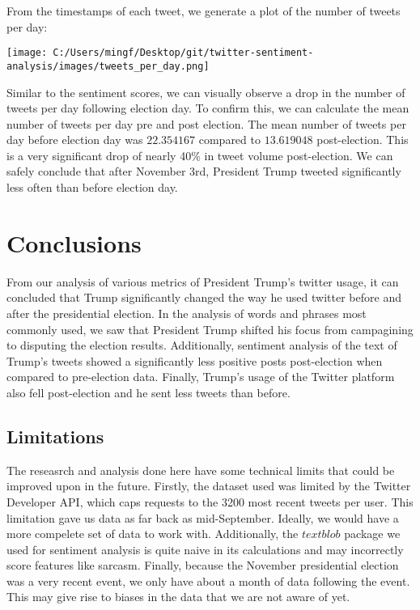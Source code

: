 \documentclass[11pt]{article} %
\begin{document}
From the timestamps of each tweet, we generate a plot of the number of tweets per day:

\begin{center}
    \texttt{[image: C:/Users/mingf/Desktop/git/twitter-sentiment-analysis/images/tweets\_per\_day.png]}
\end{center}

Similar to the sentiment scores, we can visually observe a drop in the number of tweets per day following election day.
To confirm this, we can calculate the mean number of tweets per day pre and post election.
The mean number of tweets per day before election day was $22.354167$ compared to $13.619048$ post-election.
This is a very significant drop of nearly 40\% in tweet volume post-election.
We can safely conclude that after November 3rd, President Trump tweeted significantly less often than before election day.

\section{Conclusions}

From our analysis of various metrics of President Trump's twitter usage, it can concluded that Trump significantly changed the way he used twitter before and after the presidential election.
In the analysis of words and phrases most commonly used, we saw that President Trump shifted his focus from campagining to disputing the election results.
Additionally, sentiment analysis of the text of Trump's tweets showed a significantly less positive posts post-election when compared to pre-election data.
Finally, Trump's usage of the Twitter platform also fell post-election and he sent less tweets than before.

\subsection{Limitations}

The reseasrch and analysis done here have some technical limits that could be improved upon in the future.
Firstly, the dataset used was limited by the Twitter Developer API, which caps requests to the 3200 most recent tweets per user.
This limitation gave us data as far back as mid-September.
Ideally, we would have a more compelete set of data to work with.
Additionally, the $textblob$ package we used for sentiment analysis is quite naive in its calculations and may incorrectly score features like sarcasm.
Finally, because the November presidential election was a very recent event, we only have about a month of data following the event.
This may give rise to biases in the data that we are not aware of yet.
\end{document}
